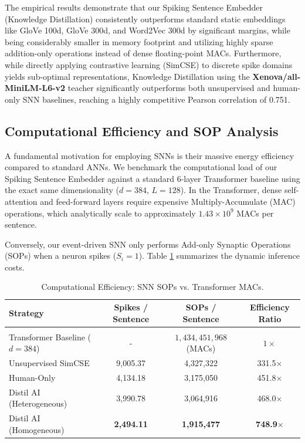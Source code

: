 \documentclass{article} %
\begin{document}
The empirical results demonstrate that our Spiking Sentence Embedder (Knowledge Distillation) consistently outperforms standard static embeddings like GloVe 100d, GloVe 300d, and Word2Vec 300d by significant margins, while being considerably smaller in memory footprint and utilizing highly sparse addition-only operations instead of dense floating-point MACs. Furthermore, while directly applying contrastive learning (SimCSE) to discrete spike domains yields sub-optimal representations, Knowledge Distillation using the \textbf{Xenova/all-MiniLM-L6-v2} teacher significantly outperforms both unsupervised and human-only SNN baselines, reaching a highly competitive Pearson correlation of 0.751.

\subsection{Computational Efficiency and SOP Analysis}
A fundamental motivation for employing SNNs is their massive energy efficiency compared to standard ANNs. We benchmark the computational load of our Spiking Sentence Embedder against a standard 6-layer Transformer baseline using the exact same dimensionality ($d=384$, $L=128$). In the Transformer, dense self-attention and feed-forward layers require expensive Multiply-Accumulate (MAC) operations, which analytically scale to approximately $1.43 \times 10^9$ MACs per sentence.

Conversely, our event-driven SNN only performs Add-only Synaptic Operations (SOPs) when a neuron spikes ($S_i=1$). Table \ref{tab:efficiency} summarizes the dynamic inference costs.

\begin{table}[h]
\caption{Computational Efficiency: SNN SOPs vs. Transformer MACs.}
\label{tab:efficiency}
\begin{center}
\begin{tabular}{lccc}
\multicolumn{1}{l}{\bf Strategy} &\multicolumn{1}{c}{\bf Spikes / Sentence} &\multicolumn{1}{c}{\bf SOPs / Sentence} &\multicolumn{1}{c}{\bf Efficiency Ratio}
\\ \hline \\
Transformer Baseline ($d=384$) & - & $1,434,451,968$ (MACs) & $1\times$ \\
Unsupervised SimCSE   & 9,005.37 & 4,327,322 & 331.5$\times$ \\
Human-Only            & 4,134.18 & 3,175,050 & 451.8$\times$ \\
Distil AI (Heterogeneous) & 3,990.78 & 3,064,916 & 468.0$\times$ \\
Distil AI (Homogeneous)   & \textbf{2,494.11} & \textbf{1,915,477} & \textbf{748.9$\times$} \\
\end{tabular}
\end{center}
\end{table}
\end{document}

